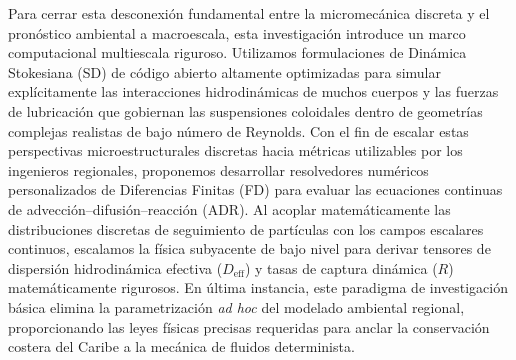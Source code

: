 Para cerrar esta desconexión fundamental entre la micromecánica discreta y el pronóstico ambiental a macroescala, esta investigación introduce un marco computacional multiescala riguroso. Utilizamos formulaciones de Dinámica Stokesiana (SD) de código abierto altamente optimizadas \cite{brady1988stokesian, durlofsky1987dynamic, sierou2001accelerated, banchio2003accelerated} para simular explícitamente las interacciones hidrodinámicas de muchos cuerpos y las fuerzas de lubricación que gobiernan las suspensiones coloidales dentro de geometrías complejas realistas de bajo número de Reynolds. Con el fin de escalar estas perspectivas microestructurales discretas hacia métricas utilizables por los ingenieros regionales, proponemos desarrollar resolvedores numéricos personalizados de Diferencias Finitas (FD) para evaluar las ecuaciones continuas de advección--difusión--reacción (ADR). Al acoplar matemáticamente las distribuciones discretas de seguimiento de partículas con los campos escalares continuos, escalamos la física subyacente de bajo nivel para derivar tensores de dispersión hidrodinámica efectiva ($D_{\text{eff}}$) y tasas de captura dinámica ($R$) matemáticamente rigurosos. En última instancia, este paradigma de investigación básica elimina la parametrización \emph{ad hoc} del modelado ambiental regional, proporcionando las leyes físicas precisas requeridas para anclar la conservación costera del Caribe a la mecánica de fluidos determinista.
